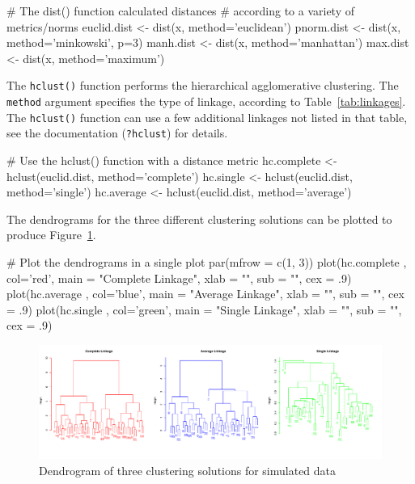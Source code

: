 \begin{samepage}
\begin{Rcode}
# The dist() function calculated distances
# according to a variety of metrics/norms
euclid.dist <- dist(x, method='euclidean')
pnorm.dist <- dist(x, method='minkowski', p=3)
manh.dist <- dist(x, method='manhattan')
max.dist <- dist(x, method='maximum')
\end{Rcode}
\end{samepage}

The \texttt{hclust()} function performs the hierarchical agglomerative clustering. The \texttt{method} argument specifies the type of linkage, according to Table~\ref{tab:linkages}. The \texttt{hclust()} function can use a few additional linkages not listed in that table, see the documentation (\texttt{?hclust}) for details. 

\begin{samepage}
\begin{Rcode}
# Use the hclust() function with a distance metric
hc.complete <- hclust(euclid.dist, method='complete')
hc.single <- hclust(euclid.dist, method='single')
hc.average <- hclust(euclid.dist, method='average')
\end{Rcode}
\end{samepage}

The dendrograms for the three different clustering solutions can be plotted to produce Figure~\ref{fig:dendro4}. 

\begin{samepage}
\begin{Rcode}
# Plot the dendrograms in a single plot
par(mfrow = c(1, 3))
plot(hc.complete , col='red', 
   main = "Complete Linkage", xlab = "", sub = "", cex = .9)
plot(hc.average , col='blue', 
   main = "Average Linkage", xlab = "", sub = "", cex = .9)
plot(hc.single , col='green', 
   main = "Single Linkage", xlab = "", sub = "", cex = .9)
\end{Rcode}
\end{samepage}

\begin{figure}
\centering
\includegraphics[width=\textwidth]{hclust.pdf}
\caption{Dendrogram of three clustering solutions for simulated data}
\label{fig:dendro4}
\end{figure}

